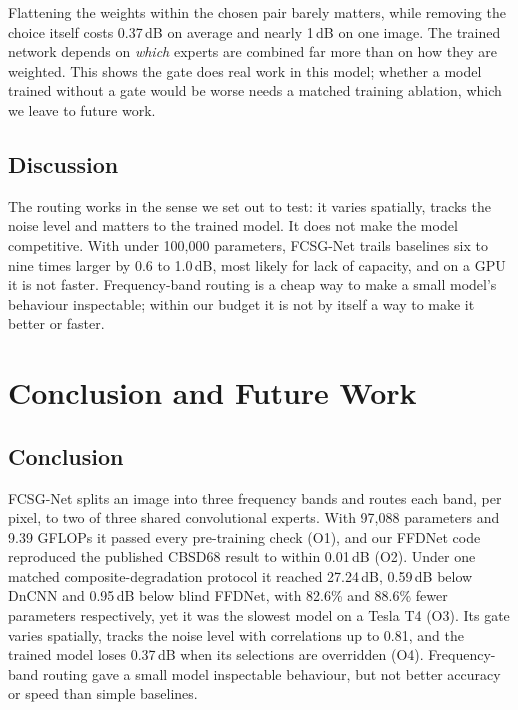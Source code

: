\documentclass[12pt,a4paper,oneside]{NITR}
\newcommand{\fcsg}{FCSG-Net}
\newcommand{\dB}{\,dB}
\begin{document}
Flattening the weights within the chosen pair barely matters, while removing
the choice itself costs 0.37\dB{} on average and nearly 1\dB{} on one image.
The trained network depends on \emph{which} experts are combined far more than
on how they are weighted. This shows the gate does real work in this model;
whether a model trained without a gate would be worse needs a matched training
ablation, which we leave to future work.

\section{Discussion}\label{sec:discussion}

The routing works in the sense we set out to test: it varies spatially,
tracks the noise level and matters to the trained model. It does not make the
model competitive. With under 100,000 parameters, \fcsg{} trails baselines six
to nine times larger by 0.6 to 1.0\dB{}, most likely for lack of capacity, and
on a GPU it is not faster. Frequency-band routing is a cheap way to make a
small model's behaviour inspectable; within our budget it is not by itself a
way to make it better or faster.


\chapter{Conclusion and Future Work}\label{ch:conclusion}

\section{Conclusion}\label{sec:summary}

\fcsg{} splits an image into three frequency bands and routes each band, per
pixel, to two of three shared convolutional experts. With 97,088 parameters
and 9.39 GFLOPs it passed every pre-training check (O1), and our FFDNet code
reproduced the published CBSD68 result to within 0.01\dB{} (O2). Under one
matched composite-degradation protocol it reached 27.24\dB{}, 0.59\dB{} below
DnCNN and 0.95\dB{} below blind FFDNet, with 82.6\% and 88.6\% fewer
parameters respectively, yet it was the slowest model on a Tesla T4 (O3).
Its gate varies spatially, tracks the noise level with correlations up to
0.81, and the trained model loses 0.37\dB{} when its selections are
overridden (O4). Frequency-band routing gave a small model inspectable
behaviour, but not better accuracy or speed than simple baselines.
\end{document}
